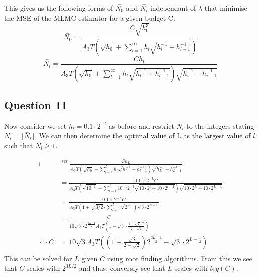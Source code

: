 \documentclass{article}
\begin{document}
This gives us the following forms of $\overset{-}{N_0}$ and $\overset{-}{N_i}$ independant of $\lambda$ that minimise the MSE of the MLMC estimator for a given budget C.
\begin{equation}
\overset{-}{N_0} = \frac{C\sqrt{h^3_0}}{A_3 T \left( \sqrt{h_0} + \sum_{l=1}^\infty h_l \sqrt{h^{-1}_l + h^{-1}_{l-1}} \right)}
\end{equation}
\begin{equation}
\overset{-}{N_i} = \frac{C h_i}{A_3 T \left( \sqrt{h_0} + \sum_{l=1}^\infty h_l \sqrt{h^{-1}_l + h^{-1}_{l-1}} \right) \sqrt{h_i^{-1}+h_{i-1}^{-1}}}
\end{equation}

\subsection{Question 11}
Now consider we set $h_l= 0.1 \cdot 2^{-l}$ as before and restrict $N_l$ to the integers stating $N_l= \lfloor \overset{-}{N}_l \rfloor$. We can then determine the optimal value of L as the largest value of $l$ such that $N_l \geq1$.

\begin{equation*}
\begin{split}
1 &\overset{set}{=} \frac{Ch_L}{A_3 T \left( \sqrt{h_0} + \sum_{l=1}^L h_l \sqrt{h^{-1}_l + h^{-1}_{l-1}} \right) \sqrt{h_L^{-1}+h_{L-1}^{-1}}} \\
&= \frac{0.1 \times 2^{-L}C}{A_3 T \left( \sqrt{10^{-1}} + \sum_{l=1}^L 10^{-1} 2^{-l}\sqrt{10 \cdot 2^l + 10 \cdot 2^{l-1}} \right) \sqrt{10 \cdot 2^L +10 \cdot 2^{L-1}}} \\
&= \frac{0.1 \times 2^{-L}C}{A_3 T \left( 1 + \sqrt{3/2} \cdot \sum_{l=1}^L \sqrt{2^{-l}} \right) \sqrt{3 \cdot 2^{L-1}}} \\
&= \frac{C}{10 \sqrt{3} \cdot 2^{\frac{3L-1}{2}} A_3 T \left( 1 + \sqrt{3} \cdot \frac{1-\sqrt{2}^{-L}}{2-\sqrt{2}} \right) } \\
\iff C &= 10\sqrt{3}A_3T \left( \left(1+\frac{\sqrt{3}}{{2-\sqrt{2}}} \right)2^{\frac{3L-1}{2}}-\sqrt{3} \cdot 2^{L-\frac{1}{2}} \right) \\
\end{split}
\end{equation*}
This can be solved for $L$ given $C$ using root finding algorithms. From this we see that $C$ scales with $2^{3L/2}$ and thus, conversly see that $L$ scales with $log(C)$.

\indent
\end{document}
